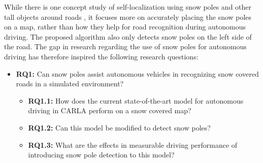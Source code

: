 While there is one concept study of self-localization using snow poles and other tall objects around roads \cite{concept-study-self-localization-laser-scanner}, it focuses more on accurately placing the snow poles on a map,
rather than how they help for road recognition during autonomous driving.
The proposed algorithm also only detects snow poles on the left side of the road.
The gap in research regarding the use of snow poles for autonomous driving has therefore inspired the following research questions:

\begin{itemize}
    \item \textbf{RQ1:} Can snow poles assist autonomous vehicles in recognizing snow covered roads in a simulated environment?
    \begin{itemize}
        \item \textbf{RQ1.1:} How does the current state-of-the-art model for autonomous driving in CARLA perform on a snow covered map?
        \item \textbf{RQ1.2:} Can this model be modified to detect snow poles?
        \item \textbf{RQ1.3:} What are the effects in measurable driving performance of introducing snow pole detection to this model?
    \end{itemize}
\end{itemize}



